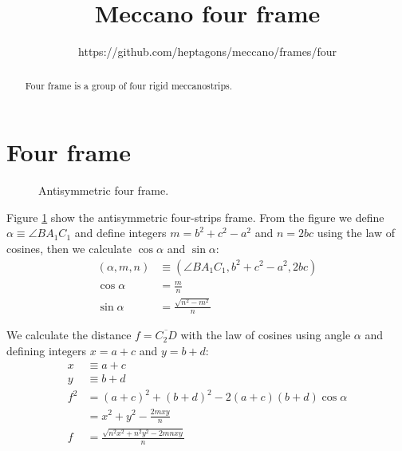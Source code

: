 \documentclass[11pt]{article}
\title{\textbf{Meccano four frame}}
\author{https://github.com/heptagons/meccano/frames/four}
\date{}
\begin{document}
\maketitle
\begin{abstract}
Four frame is a group of four rigid meccano\meccanoref strips.
\end{abstract}

\section{Four frame}

\begin{figure}[H]
 \centering
 \caption{Antisymmetric four frame.}
 \label{fig:four}
\end{figure}

Figure \ref{fig:four} show the antisymmetric four-strips frame.
From the figure we define $\alpha \equiv \angle{BA_1C_1}$ and define integers $m=b^2 + c^2 - a^2$ and $n=2bc$ using the law of cosines, then we calculate $\cos\alpha$ and $\sin\alpha$:
\begin{align}
(\alpha,m,n) &\equiv (\angle{BA_1C_1},b^2 + c^2 - a^2, 2bc)\\
\cos\alpha &= \frac{m}n\\
\sin\alpha &= \frac{\sqrt{n^2-m^2}}n
\end{align}

We calculate the distance $f = \overline{C_2D}$ with the law of cosines using angle $\alpha$
and defining integers $x = a+c$ and $y = b+d$:
\begin{align}
x &\equiv a + c\\
y &\equiv b + d\\
f^2 &= (a+c)^2 + (b+d)^2 - 2(a+c)(b+d)\cos\alpha\\
 &= x^2 + y^2 - \frac{2mxy}{n}\\
f &= \frac{\sqrt{n^2x^2 + n^2y^2 - 2mnxy}}{n}
\end{align}
\end{document}
